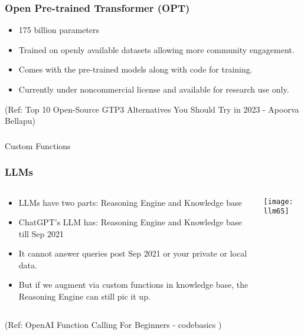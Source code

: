 \begin{frame}[fragile]\frametitle{Open Pre-trained Transformer (OPT) }

\begin{itemize}
\item 175 billion parameters
\item Trained on openly available datasets allowing more community engagement. 
\item Comes with the pre-trained models along with code for training.
\item Currently under noncommercial license and available for research use only. 
\end{itemize}	 

\tiny{(Ref: Top 10 Open-Source GTP3 Alternatives You Should Try in 2023 - Apoorva Bellapu)}
\end{frame}

\begin{frame}[fragile]\frametitle{}
\begin{center}
{\Large Custom Functions}
\end{center}
\end{frame}

\begin{frame}[fragile]\frametitle{LLMs}

\begin{columns}
    \begin{column}[T]{0.6\linewidth}
      \begin{itemize}
		\item LLMs have two parts: Reasoning Engine and Knowledge base
		\item ChatGPT's LLM has: Reasoning Engine and Knowledge base till Sep 2021
		\item It cannot answer queries post Sep 2021 or your private or local data.
		\item But if we augment via custom functions in knowledge base, the Reasoning Engine can still pic it up.
	  \end{itemize}

    \end{column}
    \begin{column}[T]{0.4\linewidth}
\begin{center}
\texttt{[image: llm65]}
\end{center}
    \end{column}
  \end{columns}

{\tiny (Ref: OpenAI Function Calling For Beginners - codebasics )}

\end{frame}

